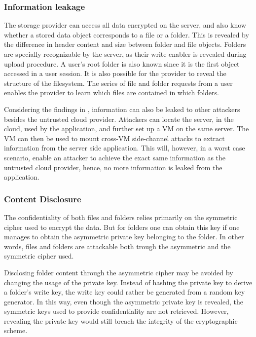 \documentclass[pdftex,english,10pt,b5paper,twoside]{book}
\begin{document}
\subsubsection{Information leakage}
The storage provider can access all data encrypted on the server, and also know whether a
stored data object corresponds to a file or a folder. This is revealed by the
difference in header content and size between folder and file objects. Folders
are specially recognizable by the server, as their write enabler is revealed
during upload procedure. A user's root folder is also known since it is the
first object accessed in a user session. It is also possible for the provider to
reveal the structure of the filesystem. The series of file and folder requests
from a user enables the provider to learn which files are contained in which folders.

Considering the findings in \cite{cloud_getoff}, information can also be leaked
to other attackers besides the untrusted cloud provider. Attackers can locate
the server, in the cloud, used by the application, and further set up a \ac{VM} on the same
server. The \ac{VM} can then be used to mount cross-\ac{VM} side-channel attacks
to extract information from the server side application. This will, however, in
a worst case scenario, enable an attacker to achieve the exact same information
as the untrusted cloud provider, hence, no more information is leaked from the
application.

\subsubsection{Content Disclosure}
The confidentiality of both files and folders relies primarily on the symmetric
cipher used to encrypt the data. But for folders one can obtain this key if one
manages to obtain the asymmetric private key belonging to the folder. In other
words, files and folders are attackable both trough the asymmetric and the
symmetric cipher used.

Disclosing folder content through the asymmetric cipher may be avoided by changing the
usage of the private key. Instead of hashing the private key to derive a folder's
write key, the write key could rather be generated from a random key generator.
In this way, even though the asymmetric private key is revealed, the symmetric
keys used to provide confidentiality are not retrieved. However, revealing the
private key would still breach the integrity of the cryptographic scheme.
\end{document}
